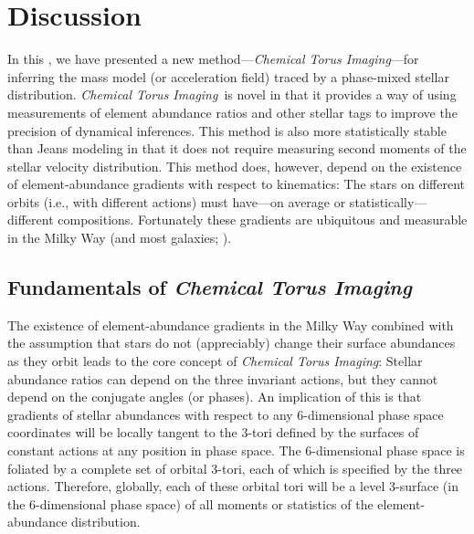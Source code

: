 \documentclass[modern]{aastex63}
\newcommand{\methodname}{\textsl{Chemical Torus Imaging}}
\begin{document}
\section{Discussion}
\label{sec:discussion}

In this \documentname, we have presented a new method---\methodname---for
inferring the mass model (or acceleration field) traced by a phase-mixed
stellar distribution.
\methodname\ is novel in that it provides a way of using measurements of element
abundance ratios and other stellar tags to improve the precision of dynamical
inferences.
This method is also more statistically stable than Jeans modeling in that it
does not require measuring second moments of the stellar velocity distribution.
This method does, however, depend on the existence of element-abundance
gradients with respect to kinematics: The stars on different orbits (i.e., with
different actions) must have---on average or statistically---different
compositions.
Fortunately these gradients are ubiquitous and measurable in the Milky Way (and
most galaxies; \citealt{TODO}).


\subsection{Fundamentals of \methodname}

The existence of element-abundance gradients in the Milky Way combined with the
assumption that stars do not (appreciably) change their surface abundances as
they orbit leads to the core concept of \methodname:
Stellar abundance ratios can depend on the three invariant actions, but they
cannot depend on the conjugate angles (or phases).
An implication of this is that gradients of stellar abundances with respect to
any 6-dimensional phase space coordinates will be locally tangent to the 3-tori
defined by the surfaces of constant actions at any position in phase space.
The 6-dimensional phase space is foliated by a complete set of orbital
3-tori, each of which is specified by the three actions.
Therefore, globally, each of these orbital tori will be a level 3-surface (in
the 6-dimensional phase space) of all moments or statistics of the
element-abundance distribution.
\end{document}

